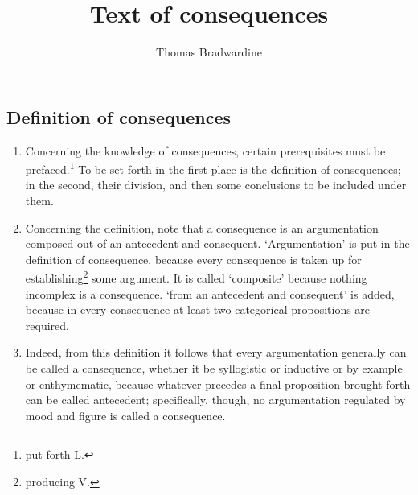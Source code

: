 \documentclass[]{article}
\title{Text of consequences}
\author{Thomas Bradwardine}
\begin{document}
\maketitle

\begin{abstract}

\end{abstract}

\section{}
	\subsection{Definition of consequences}
\begin{enumerate}
	\item[1.] Concerning the knowledge of consequences, certain prerequisites must be prefaced.\footnote{put forth L.} To be set forth in the first place is the definition of consequences; in the second, their division, and then some conclusions to be included under them.
	\item[2.] Concerning the definition, note that a consequence is an argumentation composed out of an antecedent and consequent. `Argumentation' is put in the definition of consequence, because every consequence is taken up for establishing\footnote{producing V.} some argument. It is called `composite' because nothing incomplex is a consequence. `from an antecedent and consequent' is added, because in every consequence at least two categorical propositions are required.
	\item[3.] Indeed, from this definition it follows that every argumentation generally can be called a consequence, whether it be syllogistic or inductive or by example or enthymematic, because whatever precedes a final proposition brought forth can be called antecedent; specifically, though, no argumentation regulated by mood and figure is called a consequence.
\end{enumerate}
\end{document}

